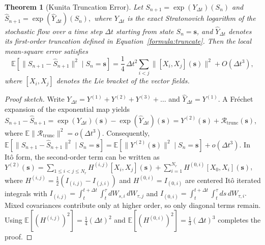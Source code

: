 \documentclass[10pt,a4paper]{amsart}
\newtheorem{theorem}{Theorem}
\begin{document}
\begin{theorem}[Kunita Truncation Error]
\label{lem:truncation}
Let
$
S_{n+1} = \exp(Y_{\Delta t})(S_n)$ and $
\widehat{S}_{n+1} = \exp(\widehat{Y}_{\Delta t})(S_n),$
where $Y_{\Delta t}$ is the exact Stratonovich logarithm of the stochastic flow
over a time step $\Delta t$ starting from state $S_n=\pmb{s}$, and $\widehat{Y}_{\Delta t}$ denotes its first-order
truncation defined in Equation~\eqref{formula:truncate}.
Then the local mean-square error satisfies
\begin{equation}
\label{eq:Kunita_truncation}
\mathbb{E}\!\left[
\|S_{n+1}-\widehat{S}_{n+1}\|^2
\mid S_n=\pmb{s}
\right]
=
\frac14\,\Delta t^2
\sum_{i<j}
\|[X_i,X_j](\pmb{s})\|^2
+
O(\Delta t^3),
\end{equation}
where $[X_i,X_j]$ denotes the Lie bracket of the vector fields.
\end{theorem}

\begin{proof}[Proof sketch]
Write $Y_{\Delta t}=Y^{(1)}+Y^{(2)}+Y^{(3)}+\ldots$ and
$\hat Y_{\Delta t}=Y^{(1)}$.
A Fréchet expansion of the exponential map yields
$S_{n+1}-\hat S_{n+1}
=\exp(Y_{\Delta t})(\pmb{s})-\exp(\hat Y_{\Delta t})(\pmb{s})
=Y^{(2)}(\pmb{s})+\mathcal R_{\mathrm{trunc}}(\pmb{s})$, where
$\mathbb E\|\mathcal R_{\mathrm{trunc}}\|^{2}=o(\Delta t^3)$.
Consequently,
$\mathbb E[\|S_{n+1}-\hat S_{n+1}\|^{2}\mid S_n=\pmb{s}]
=\mathbb E[\|Y^{(2)}(\pmb{s})\|^{2}\mid S_n=\pmb{s}]+o(\Delta t^{3})$.
In Itô form, the second‑order term can be written as
$Y^{(2)}(\pmb{s})
=\sum_{1\le i<j\le N_r}H^{(i,j)}[X_i,X_j](\pmb{s})
 +\sum_{i=1}^{N_r} H^{(0,i)}[X_0,X_i](\pmb{s})$,
where 
$H^{(i,j)}=\tfrac12(I_{(i,j)}-I_{(j,i)})$ and $H^{(0,i)}=I_{(0,i)}$ are
centered Itô iterated integrals with
$I_{(i,j)} = \int_t^{t+\Delta t} \int_t^{\tau} dW_{s,i}\, dW_{\tau,j}$ and $
I_{(0,i)} = \int_t^{t+\Delta t} \int_t^{\tau} ds\, dW_{\tau,i}.$ 
Mixed covariances contribute only at higher
order, so only diagonal terms remain.
Using $\mathbb E[(H^{(i,j)})^{2}]=\tfrac14(\Delta t)^2$ and
$\mathbb E[(H^{(0,i)})^{2}]=\tfrac13(\Delta t)^3$ completes the proof.
\end{proof}
\end{document}
